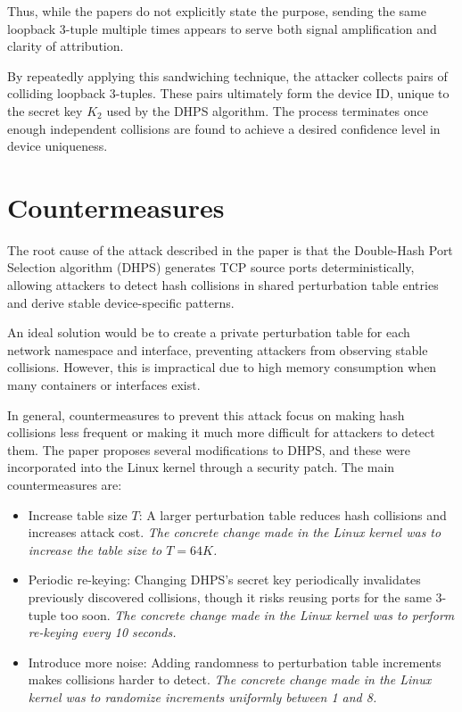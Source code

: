 \documentclass{report}
\begin{document}
Thus, while the papers do not explicitly state the purpose, sending the same loopback 3-tuple multiple times appears to serve both signal amplification and clarity of attribution.

By repeatedly applying this sandwiching technique, the attacker collects pairs of colliding loopback 3-tuples. These pairs ultimately form the device ID, unique to the secret key $K_2$ used by the DHPS algorithm. The process terminates once enough independent collisions are found to achieve a desired confidence level in device uniqueness.

\vspace{0.5cm}
\chapter{Countermeasures}
\label{sec:countermeasures}

The \alert{root cause} of the attack described in the paper is that the Double-Hash Port Selection algorithm (DHPS) generates TCP source ports deterministically, allowing attackers to detect hash collisions in shared perturbation table entries and derive stable device-specific patterns.

An \alert{ideal solution} would be to create a private perturbation table for each network namespace and interface, preventing attackers from observing stable collisions. However, this is impractical due to high memory consumption when many containers or interfaces exist.

In \alert{general}, \alert{countermeasures} to prevent this attack focus on making hash collisions less frequent or making it much more difficult for attackers to detect them. The paper proposes several modifications to DHPS, and these were incorporated into the Linux kernel through a security patch. The main countermeasures are:

\begin{itemize}
    \item \alert{Increase table size $T$:}  
    A larger perturbation table reduces hash collisions and increases attack cost.  
    \textit{The concrete change made in the Linux kernel was to increase the table size to $T = 64K$.}

    \item \alert{Periodic re-keying:}  
    Changing DHPS’s secret key periodically invalidates previously discovered collisions, though it risks reusing ports for the same 3-tuple too soon.  
    \textit{The concrete change made in the Linux kernel was to perform re-keying every 10 seconds.}

    \item \alert{Introduce more noise:}  
    Adding randomness to perturbation table increments makes collisions harder to detect.  
    \textit{The concrete change made in the Linux kernel was to randomize increments uniformly between 1 and 8.}
\end{itemize}
\end{document}
